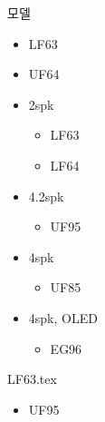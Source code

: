 \documentclass{beamer}
\begin{document}
\begin{frame}[t]{모델}
\tableofcontents
\huge
\begin{itemize}
\huge \item LF63
\huge \item UF64
\end{itemize}
\end{frame}

\begin{frame}[t]{}
\tableofcontents
\huge
\begin{itemize}
\huge \item 2spk
	\begin{itemize}
	\large \item LF63
	\large \item LF64
	\end{itemize}
\huge \item 4.2spk
	\begin{itemize}
	\large \item UF95
	\end{itemize}
\huge \item 4spk
	\begin{itemize}
	\large \item UF85
	\end{itemize}
\huge \item 4spk, OLED
	\begin{itemize}
	\large \item EG96
	\end{itemize}			
\end{itemize}
\end{frame}





{LF63.tex}


\begin{frame}[t]{}
\tableofcontents
\huge
\begin{itemize}
\huge \item UF95
\end{itemize}
\end{frame}
\end{document}
